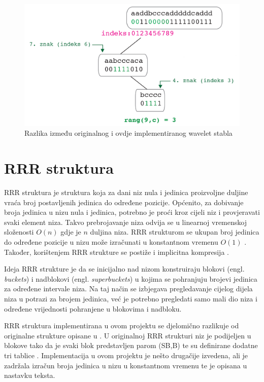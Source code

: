 \begin{figure}[H]
\centering
\includegraphics[width=\linewidth]{./pictures/Waveletquery.jpg}
\caption{Razlika između originalnog i ovdje implementiranog wavelet stabla}\label{query}
\end{figure}


\section{RRR struktura}
RRR struktura je struktura koja za dani niz nula i jedinica proizvoljne duljine vraća broj postavljenih jedinica do određene pozicije. Općenito, za dobivanje broja jedinica u nizu nula i jedinica, potrebno je proći kroz cijeli niz i provjeravati svaki element niza. Takvo prebrojavanje niza odvija se u linearnoj vremenskoj složenosti $O(n)$ gdje je $n$ duljina niza. RRR strukturom se ukupan broj jedinica do određene pozicije u nizu može izračunati u konstantnom vremenu $O(1)$ \cite{rrr1}. Također, korištenjem RRR strukture se postiže i implicitna kompresija \cite{alexRRR}. 

Ideja RRR strukture je da se inicijalno nad nizom konstruiraju blokovi (engl. \textit{buckets}) i nadblokovi (engl. \textit{superbuckets}) u kojima se pohranjuju brojevi jedinica za određene intervale niza. Na taj način se izbjegava pregledavanje cijelog dijela niza u potrazi za brojem jedinica, već je potrebno pregledati samo mali dio niza i određene vrijednosti pohranjene u blokovima i nadbloku. 

RRR struktura implementirana u ovom projektu se djelomično razlikuje od originalne strukture opisane u \cite{rrr1}. U originalnoj RRR strukturi niz je podijeljen u blokove tako da je svaki blok predstavljen parom (SB,B) te su definirane dodatne tri tablice \cite{rrr2}. Implementacija u ovom projektu je nešto drugačije izvedena, ali je zadržala izračun broja jedinica u nizu u konstantnom vremenu te je opisana u nastavku teksta.

